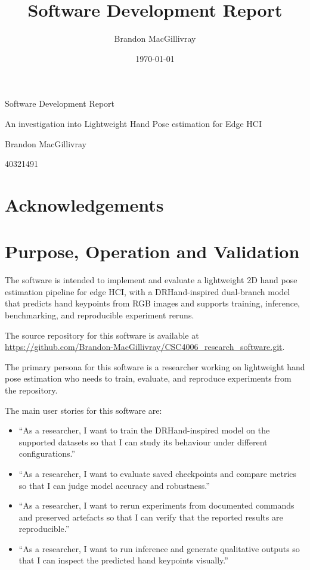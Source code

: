﻿\documentclass[11pt,a4paper]{article}
\title{Software Development Report}
\author{Brandon MacGillivray}
\date{\today}
\begin{document}
\hypersetup{pageanchor=false}
\begin{titlepage}
\centering
{\LARGE Software Development Report\par}
\vspace{1.5cm}
{\large An investigation into Lightweight Hand Pose estimation for Edge HCI\par}
\vspace{1cm}
{\large Brandon MacGillivray\par}
\vspace{0.5cm}
{\large 40321491\par}
\vfill
\end{titlepage}
\hypersetup{pageanchor=true}

\section*{Acknowledgements}

\tableofcontents
\newpage

\section{Purpose, Operation and Validation}

The software is intended to implement and evaluate a lightweight 2D hand pose estimation pipeline for edge HCI, with a DRHand-inspired dual-branch model that predicts hand keypoints from RGB images and supports training, inference, benchmarking, and reproducible experiment reruns.

\medskip

\noindent The source repository for this software is available at
\url{https://github.com/Brandon-MacGillivray/CSC4006_research_software.git}.


\medskip

\noindent The primary persona for this software is a researcher working on
lightweight hand pose estimation who needs to train, evaluate, and reproduce
experiments from the repository.

\medskip

\noindent The main user stories for this software are:
\begin{itemize}
    \item ``As a researcher, I want to train the DRHand-inspired model on the
    supported datasets so that I can study its behaviour under different
    configurations.''
    \item ``As a researcher, I want to evaluate saved checkpoints and compare
    metrics so that I can judge model accuracy and robustness.''
    \item ``As a researcher, I want to rerun experiments from documented
    commands and preserved artefacts so that I can verify that the reported
    results are reproducible.''
    \item ``As a researcher, I want to run inference and generate qualitative
    outputs so that I can inspect the predicted hand keypoints visually.''
\end{itemize}
\end{document}
